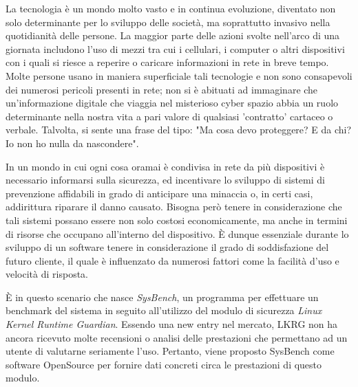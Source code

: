 \begin{preface}
\addchaptertocentry{\prefacename}
La tecnologia è un mondo molto vasto e in continua evoluzione, diventato non solo determinante per lo sviluppo delle società, ma soprattutto invasivo nella quotidianità delle persone. La maggior parte delle azioni svolte nell'arco di una giornata includono l'uso di mezzi tra cui i cellulari, i computer o altri dispositivi con i quali si riesce a reperire o caricare informazioni in rete in breve tempo. Molte persone usano in maniera superficiale tali tecnologie e non sono consapevoli dei numerosi pericoli presenti in rete; non si è abituati ad immaginare che un'informazione digitale che viaggia nel misterioso cyber spazio abbia un ruolo determinante nella nostra vita a pari valore di qualsiasi 'contratto' cartaceo o verbale. 
Talvolta, si sente una frase del tipo: "Ma cosa devo proteggere? E da chi? Io non ho nulla da nascondere".

In un mondo in cui ogni cosa oramai è condivisa in rete da più dispositivi è necessario informarsi sulla sicurezza, ed incentivare lo sviluppo di sistemi di prevenzione affidabili in grado di anticipare una minaccia o, in certi casi, addirittura riparare il danno causato. Bisogna però tenere in considerazione che tali sistemi possano essere non solo costosi economicamente, ma anche in termini di risorse che occupano all'interno del dispositivo. È dunque essenziale durante lo sviluppo di un software tenere in considerazione il grado di soddisfazione del futuro cliente, il quale è influenzato da numerosi fattori come la facilità d'uso e velocità di risposta.

È in questo scenario che nasce \emph{SysBench}, un programma per effettuare un benchmark del sistema in seguito all'utilizzo del modulo di sicurezza \emph{Linux Kernel Runtime Guardian}. Essendo una new entry nel mercato, LKRG non ha ancora ricevuto molte recensioni o analisi delle prestazioni che permettano ad un utente di valutarne seriamente l'uso. Pertanto, viene proposto SysBench come software OpenSource per fornire dati concreti circa le prestazioni di questo modulo. 

\end{preface}